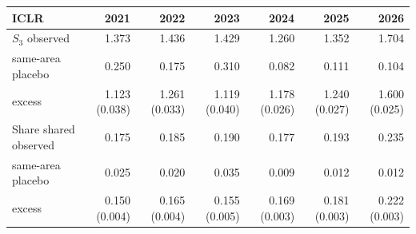 \begin{tabular}{lrrrrrr}
\toprule
ICLR & 2021 & 2022 & 2023 & 2024 & 2025 & 2026 \\
\midrule
$S_3$ observed & 1.373 & 1.436 & 1.429 & 1.260 & 1.352 & 1.704 \\
\quad same-area placebo & 0.250 & 0.175 & 0.310 & 0.082 & 0.111 & 0.104 \\
\quad excess & 1.123 (0.038) & 1.261 (0.033) & 1.119 (0.040) & 1.178 (0.026) & 1.240 (0.027) & 1.600 (0.025) \\
Share shared observed & 0.175 & 0.185 & 0.190 & 0.177 & 0.193 & 0.235 \\
\quad same-area placebo & 0.025 & 0.020 & 0.035 & 0.009 & 0.012 & 0.012 \\
\quad excess & 0.150 (0.004) & 0.165 (0.004) & 0.155 (0.005) & 0.169 (0.003) & 0.181 (0.003) & 0.222 (0.003) \\
\bottomrule
\end{tabular}
